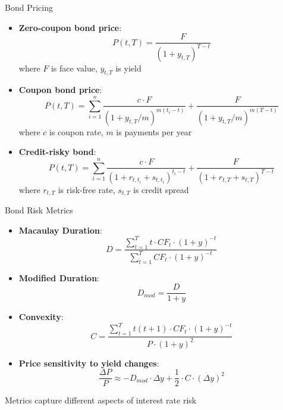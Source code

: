 \documentclass{beamer}
\begin{document}
\begin{frame}{Bond Pricing}
\begin{itemize}
    \item \textbf{Zero-coupon bond price}:
    \begin{equation}
    P(t,T) = \frac{F}{(1+y_{t,T})^{T-t}}
    \end{equation}
    where $F$ is face value, $y_{t,T}$ is yield
    
    \item \textbf{Coupon bond price}:
    \begin{equation}
    P(t,T) = \sum_{i=1}^n \frac{c \cdot F}{(1+y_{t,T}/m)^{m(t_i-t)}} + \frac{F}{(1+y_{t,T}/m)^{m(T-t)}}
    \end{equation}
    where $c$ is coupon rate, $m$ is payments per year
    
    \item \textbf{Credit-risky bond}:
    \begin{equation}
    P(t,T) = \sum_{i=1}^n \frac{c \cdot F}{(1+r_{t,t_i}+s_{t,t_i})^{t_i-t}} + \frac{F}{(1+r_{t,T}+s_{t,T})^{T-t}}
    \end{equation}
    where $r_{t,T}$ is risk-free rate, $s_{t,T}$ is credit spread
\end{itemize}
\end{frame}

\begin{frame}{Bond Risk Metrics}
\begin{itemize}
    \item \textbf{Macaulay Duration}:
    \begin{equation}
    D = \frac{\sum_{t=1}^{T} t \cdot CF_t \cdot (1+y)^{-t}}{\sum_{t=1}^{T} CF_t \cdot (1+y)^{-t}}
    \end{equation}
    
    \item \textbf{Modified Duration}:
    \begin{equation}
    D_{mod} = \frac{D}{1+y}
    \end{equation}
    
    \item \textbf{Convexity}:
    \begin{equation}
    C = \frac{\sum_{t=1}^{T} t(t+1) \cdot CF_t \cdot (1+y)^{-t}}{P \cdot (1+y)^2}
    \end{equation}
    
    \item \textbf{Price sensitivity to yield changes}:
    \begin{equation}
    \frac{\Delta P}{P} \approx -D_{mod} \cdot \Delta y + \frac{1}{2} \cdot C \cdot (\Delta y)^2
    \end{equation}
\end{itemize}
Metrics capture different aspects of interest rate risk
\end{frame}
\end{document}
